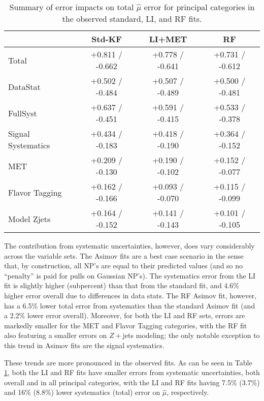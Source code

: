 \begin{table}[!htbp]\captionsetup{justification=centering}
\caption{Summary of error impacts on total $\hat{\mu}$ error for principal categories in the observed standard, LI, and RF fits.}
\begin{center}
\begin{tabular}{lccc}
\hline\hline
 &Std-KF &LI+MET &RF\\
\hline
Total &  +0.811 / -0.662  &  +0.778 / -0.641  &  +0.731 / -0.612 \\
\hline
DataStat &  +0.502 / -0.484  &  +0.507 / -0.489  &  +0.500 / -0.481 \\
\hline
FullSyst &  +0.637 / -0.451  &  +0.591 / -0.415  &  +0.533 / -0.378 \\
\hline
Signal Systematics &  +0.434 / -0.183  &  +0.418 / -0.190  &  +0.364 / -0.152 \\
\hline
MET &  +0.209 / -0.130  &  +0.190 / -0.102  &  +0.152 / -0.077 \\
\hline
Flavor Tagging &  +0.162 / -0.166  &  +0.093 / -0.070  &  +0.115 / -0.099 \\
\hline
Model Zjets &  +0.164 / -0.152  &  +0.141 / -0.143  &  +0.101 / -0.105 \\
\hline
\end{tabular}
\label{tab:bd-obs-summary}
\end{center}
\end{table}


The contribution from systematic uncertainties, however, does vary considerably across the variable sets.  The Asimov fits are a best case scenario in the sense that, by construction, all NP's are equal to their predicted values (and so no ``penalty'' is paid for pulls on Gaussian NP's).  The systematics error from the LI fit is slightly higher (subpercent) than that from the standard fit, and 4.6\% higher error overall due to differences in data stats.  The RF Asimov fit, however, has a 6.5\% lower total error from systematics than the standard Asimov fit (and a 2.2\% lower error overall).  Moreover, for both the LI and RF sets, errors are markedly smaller for the MET and Flavor Tagging categories, with the RF fit also featuring a smaller errors on $Z+$jets modeling; the only notable exception to this trend in Asimov fits are the signal systematics.

These trends are more pronounced in the observed fits.  As can be seen in Table \ref{tab:bd-obs-summary}, both the LI and RF fits have smaller errors from systematic uncertainties, both overall and in all principal categories, with the LI and RF fits having 7.5\% (3.7\%) and 16\% (8.8\%) lower systematics (total) error on $\hat{\mu}$, respectively.

